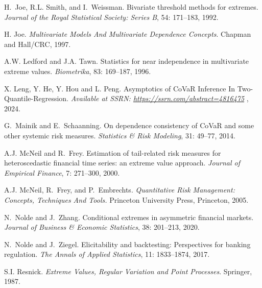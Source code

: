 \documentclass[11pt,letterpaper]{article}
\numberwithin{equation}{section}
\begin{document}
\begin{thebibliography}{29}
H.~Joe, R.L. Smith, and I.~Weissman.
\newblock Bivariate threshold methods for extremes.
\newblock \emph{Journal of the Royal Statistical Society: Series B},
  54: 171--183, 1992.

H. Joe.
\newblock \emph{Multivariate Models And Multivariate Dependence Concepts}.
\newblock Chapman and Hall/CRC, 1997.

A.W. Ledford and J.A. Tawn.
\newblock Statistics for near independence in multivariate extreme values.
\newblock \emph{Biometrika}, 83: 169--187, 1996.


X. Leng, Y. He,  Y. Hou and L. Peng. 
\newblock Asymptotics of CoVaR Inference In Two-Quantile-Regression.
\newblock \emph{Available at SSRN: \href{https://ssrn.com/abstract=4816475}{https://ssrn.com/abstract=4816475} }, 2024.



G.~Mainik and E.~Schaanning.
\newblock On dependence consistency of {CoVaR} and some other systemic risk
  measures.
\newblock \emph{Statistics \& Risk Modeling}, 31: 49--77, 2014.

A.J. McNeil and R.~Frey.
\newblock Estimation of tail-related risk measures for heteroscedastic
  financial time series: an extreme value approach.
\newblock \emph{Journal of Empirical Finance}, 7: 271--300, 2000.

A.J. McNeil, R.~Frey, and P.~Embrechts.
\newblock \emph{Quantitative Risk Management: Concepts, Techniques And Tools.}
\newblock Princeton University Press, Princeton, 2005.

N.~Nolde and J.~Zhang.
\newblock Conditional extremes in asymmetric financial markets.
\newblock \emph{Journal of Business \& Economic Statistics}, 38: 201--213, 2020.

N.~Nolde and J.~Ziegel.
\newblock Elicitability and backtesting: Perspectives for banking regulation.
\newblock \emph{The Annals of Applied Statistics}, 11: 1833--1874,
  2017.

S.I. Resnick.
\newblock \emph{Extreme Values, Regular Variation and Point Processes}.
\newblock Springer, 1987.


\end{thebibliography}
\end{document}
